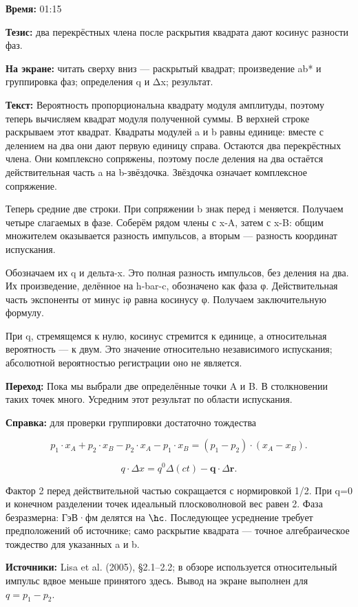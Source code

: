 \textbf{Время:} 01:15

\textbf{Тезис:} два перекрёстных члена после раскрытия квадрата дают косинус разности фаз.

\textbf{На экране:} читать сверху вниз — раскрытый квадрат; произведение ab* и группировка фаз; определения q и Δx; результат.

\textbf{Текст:} Вероятность пропорциональна квадрату модуля амплитуды, поэтому теперь вычисляем квадрат модуля полученной суммы. В верхней строке раскрываем этот квадрат. Квадраты модулей a и b равны единице: вместе с делением на два они дают первую единицу справа. Остаются два перекрёстных члена. Они комплексно сопряжены, поэтому после деления на два остаётся действительная часть a на b-звёздочка. Звёздочка означает комплексное сопряжение.

Теперь средние две строки. При сопряжении b знак перед i меняется. Получаем четыре слагаемых в фазе. Соберём рядом члены с x-A, затем с x-B: общим множителем оказывается разность импульсов, а вторым — разность координат испускания.

Обозначаем их q и дельта-x. Это полная разность импульсов, без деления на два. Их произведение, делённое на h-bar-c, обозначено как фаза φ. Действительная часть экспоненты от минус iφ равна косинусу φ. Получаем заключительную формулу.

При q, стремящемся к нулю, косинус стремится к единице, а относительная вероятность — к двум. Это значение относительно независимого испускания; абсолютной вероятностью регистрации оно не является.

\textbf{Переход:} Пока мы выбрали две определённые точки A и B. В столкновении таких точек много. Усредним этот результат по области испускания.

\textbf{Справка:} для проверки группировки достаточно тождества

\[p_1\cdot x_A+p_2\cdot x_B-p_2\cdot x_A-p_1\cdot x_B=(p_1-p_2)\cdot(x_A-x_B).\]

\[q\cdot\Delta x=q^0\Delta(ct)-\mathbf q\cdot\Delta\mathbf r.\]

Фактор 2 перед действительной частью сокращается с нормировкой 1/2. При q=0 и конечном разделении точек идеальный плосковолновой вес равен 2. Фаза безразмерна: ГэВ·фм делятся на \(\hc\). Последующее усреднение требует предположений об источнике; само раскрытие квадрата — точное алгебраическое тождество для указанных a и b.

\textbf{Источники:} Lisa et al. (2005), §2.1–2.2; в обзоре используется относительный импульс вдвое меньше принятого здесь. Вывод на экране выполнен для \(q=p_1-p_2\).

